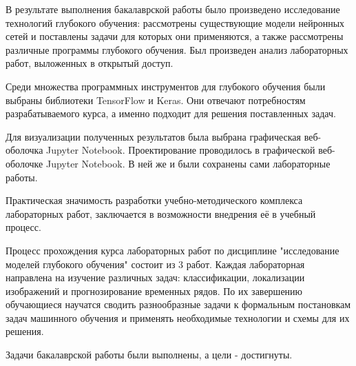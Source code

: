 \conclusion

В результате выполнения бакалаврской работы было произведено исследование технологий глубокого обучения: рассмотрены существующие модели нейронных сетей и поставлены задачи для которых они применяются, а также рассмотрены различные программы глубокого обучения. Был произведен анализ лабораторных работ, выложенных в открытый доступ.

Среди множества программных инструментов для глубокого обучения были выбраны библиотеки TensorFlow и Keras. Они отвечают потребностям разрабатываемого курса, а именно подходит для решения поставленных задач. 

Для визуализации полученных результатов была выбрана графическая веб-оболочка Jupyter Notebook. Проектирование проводилось в графической веб-оболочке Jupyter Notebook. В ней же и были сохранены сами лабораторные работы.


Практическая значимость разработки учебно-методического комплекса лабораторных работ, заключается в возможности внедрения её в учебный процесс.


Процесс прохождения курса лабораторных работ по дисциплине "исследование моделей глубокого обучения" состоит из 3 работ. Каждая лабораторная направлена на изучение различных задач: классификации, локализации изображений и прогнозирование временных рядов. По их завершению обучающиеся научатся сводить разнообразные задачи к формальным постановкам задач машинного обучения и применять необходимые технологии и схемы для их решения.

Задачи бакалаврской работы были выполнены, а цели - достигнуты.

